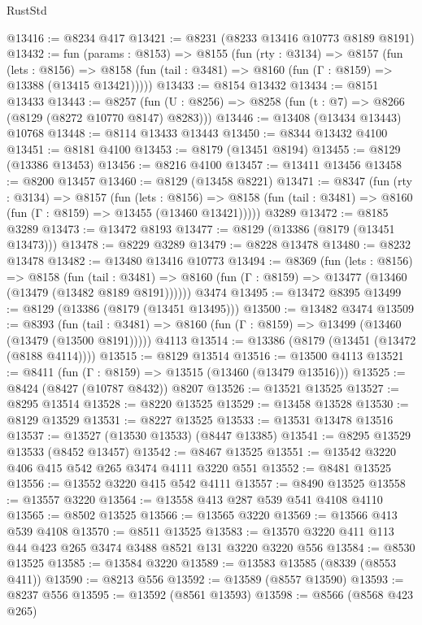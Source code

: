 \begin{lexlean}{RustStd}
\begin{coremodule}
@13416 := @8234 @417
@13421 := @8231 (@8233 @13416 @10773 @8189 @8191)
@13432 := fun (params : @8153) =>
  @8155
    (fun (rty : @3134) =>
    @8157
      (fun (lets : @8156) =>
      @8158 (fun (tail : @3481) => @8160 (fun (Γ : @8159) => @13388 (@13415 @13421)))))
@13433 := @8154 @13432
@13434 := @8151 @13433
@13443 := @8257
    (fun (U : @8256) => @8258 (fun (t : @7) => @8266 (@8129 (@8272 @10770 @8147) @8283)))
@13446 := @13408 (@13434 @13443) @10768
@13448 := @8114 @13433 @13443
@13450 := @8344 @13432 @4100
@13451 := @8181 @4100
@13453 := @8179 (@13451 @8194)
@13455 := @8129 (@13386 @13453)
@13456 := @8216 @4100
@13457 := @13411 @13456
@13458 := @8200 @13457
@13460 := @8129 (@13458 @8221)
@13471 := @8347
    (fun (rty : @3134) =>
    @8157
      (fun (lets : @8156) =>
      @8158 (fun (tail : @3481) => @8160 (fun (Γ : @8159) => @13455 (@13460 @13421)))))
    @3289
@13472 := @8185 @3289
@13473 := @13472 @8193
@13477 := @8129 (@13386 (@8179 (@13451 @13473)))
@13478 := @8229 @3289
@13479 := @8228 @13478
@13480 := @8232 @13478
@13482 := @13480 @13416 @10773
@13494 := @8369
    (fun (lets : @8156) =>
    @8158
      (fun (tail : @3481) =>
      @8160 (fun (Γ : @8159) => @13477 (@13460 (@13479 (@13482 @8189 @8191))))))
    @3474
@13495 := @13472 @8395
@13499 := @8129 (@13386 (@8179 (@13451 @13495)))
@13500 := @13482 @3474
@13509 := @8393
    (fun (tail : @3481) => @8160 (fun (Γ : @8159) => @13499 (@13460 (@13479 (@13500 @8191)))))
    @4113
@13514 := @13386 (@8179 (@13451 (@13472 (@8188 @4114))))
@13515 := @8129 @13514
@13516 := @13500 @4113
@13521 := @8411 (fun (Γ : @8159) => @13515 (@13460 (@13479 @13516)))
@13525 := @8424 (@8427 (@10787 @8432)) @8207
@13526 := @13521 @13525
@13527 := @8295 @13514
@13528 := @8220 @13525
@13529 := @13458 @13528
@13530 := @8129 @13529
@13531 := @8227 @13525
@13533 := @13531 @13478 @13516
@13537 := @13527 (@13530 @13533) (@8447 @13385)
@13541 := @8295 @13529 @13533 (@8452 @13457)
@13542 := @8467 @13525
@13551 := @13542 @3220 @406 @415 @542 @265 @3474 @4111 @3220 @551
@13552 := @8481 @13525
@13556 := @13552 @3220 @415 @542 @4111
@13557 := @8490 @13525
@13558 := @13557 @3220
@13564 := @13558 @413 @287 @539 @541 @4108 @4110
@13565 := @8502 @13525
@13566 := @13565 @3220
@13569 := @13566 @413 @539 @4108
@13570 := @8511 @13525
@13583 := @13570 @3220 @411 @113 @44 @423 @265 @3474 @3488 @8521 @131 @3220 @3220 @556
@13584 := @8530 @13525
@13585 := @13584 @3220
@13589 := @13583 @13585 (@8339 (@8553 @411))
@13590 := @8213 @556
@13592 := @13589 (@8557 @13590)
@13593 := @8237 @556
@13595 := @13592 (@8561 @13593)
@13598 := @8566 (@8568 @423 @265)

\end{coremodule}
\end{lexlean}
